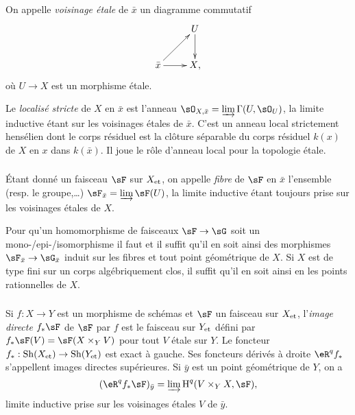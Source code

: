 On appelle \emph{voisinage étale} de $\bar x$ un diagramme commutatif 
\[\xymatrix{
  & U \ar[d] \\
  \bar x \ar[ur] \ar[r] 
  & X\text{,}
}\]
où $U\to X$ est un morphisme étale. 

Le \emph{localisé stricte} de $X$ en $\bar x$ est l'anneau 
$\sO_{X,\bar x} = \varinjlim \Gamma(U,\sO_U)$, la limite inductive étant sur les 
voisinages étales de $\bar x$. C'est un anneau local strictement hensélien dont 
le corps résiduel est la clôture séparable du corps résiduel $k(x)$ de $X$ en 
$x$ dans $k(\bar x)$. Il joue le rôle d'anneau local pour la topologie étale. 





\subsubsection{}\label{I:2-3-2}

Étant donné un faisceau $\sF$ sur ${X}_{\textnormal{et}}$, on appelle \emph{fibre} de $\sF$ en 
$\bar x$ l'ensemble (resp. le groupe,\dots) $\sF_{\bar x}=\varinjlim \sF(U)$, 
la limite inductive étant toujours prise sur les voisinages étales de  $X$. 

Pour qu'un homomorphisme de faisceaux $\sF\to \sG$ soit un 
mono-/epi-/isomorphisme il faut et il suffit qu'il en soit ainsi des morphismes 
$\sF_{\bar x}\to \sG_{\bar x}$ induit sur les fibres et tout point géométrique 
de $X$. Si $X$ est de type fini sur un corps algébriquement clos, il suffit 
qu'il en soit ainsi en les points rationnelles de $X$. 





\subsubsection{}\label{I:2-3-3}

Si $f:X\to Y$ est un morphisme de schémas et $\sF$ un faisceau sur ${X}_{\textnormal{et}}$, 
l'\emph{image directe} $f_* \sF$ de $\sF$ par $f$ est le faisceau sur ${Y}_{\textnormal{et}}$ 
défini par $f_* \sF(V) = \sF(X\times_Y V)$ pour tout $V$ étale sur $Y$. Le foncteur 
$f_*:\operatorname{Sh}({X}_{\textnormal{et}})\to \operatorname{Sh}({Y}_{\textnormal{et}})$ est exact à gauche. Ses foncteurs 
dérivés à droite $\eR^q f_*$ s'appellent images directes supérieures. Si 
$\bar y$ est un point géométrique de $Y$, on a 
\[
  (\eR^q f_* \sF)_{\bar y} = \varinjlim \h^q(V\times_Y X,\sF)\text{,}
\]
limite inductive prise sur les voisinages étales $V$ de $\bar y$. 


